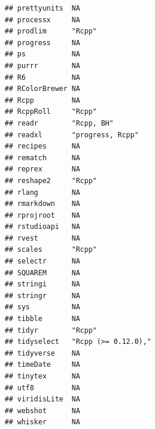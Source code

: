 \documentclass[]{article}
\begin{document}
\begin{verbatim}
## prettyunits  NA                                                    
## processx     NA                                                    
## prodlim      "Rcpp"                                                
## progress     NA                                                    
## ps           NA                                                    
## purrr        NA                                                    
## R6           NA                                                    
## RColorBrewer NA                                                    
## Rcpp         NA                                                    
## RcppRoll     "Rcpp"                                                
## readr        "Rcpp, BH"                                            
## readxl       "progress, Rcpp"                                      
## recipes      NA                                                    
## rematch      NA                                                    
## reprex       NA                                                    
## reshape2     "Rcpp"                                                
## rlang        NA                                                    
## rmarkdown    NA                                                    
## rprojroot    NA                                                    
## rstudioapi   NA                                                    
## rvest        NA                                                    
## scales       "Rcpp"                                                
## selectr      NA                                                    
## SQUAREM      NA                                                    
## stringi      NA                                                    
## stringr      NA                                                    
## sys          NA                                                    
## tibble       NA                                                    
## tidyr        "Rcpp"                                                
## tidyselect   "Rcpp (>= 0.12.0),"                                   
## tidyverse    NA                                                    
## timeDate     NA                                                    
## tinytex      NA                                                    
## utf8         NA                                                    
## viridisLite  NA                                                    
## webshot      NA                                                    
## whisker      NA                                                    

\end{verbatim}
\end{document}
